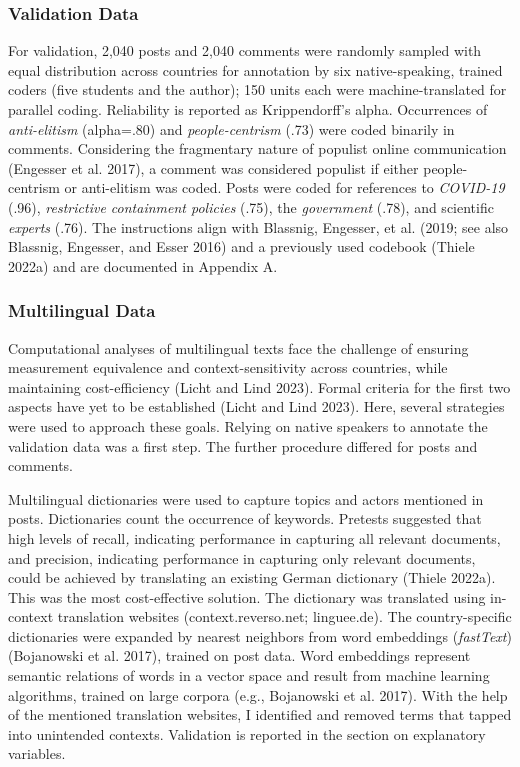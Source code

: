 \documentclass[
]{ccr}
\begin{document}
\hypertarget{validation-data}{%
\subsubsection{Validation Data}\label{validation-data}}

For validation, 2,040 posts and 2,040 comments were randomly sampled
with equal distribution across countries for annotation by six
native-speaking, trained coders (five students and the author); 150
units each were machine-translated for parallel coding. Reliability is
reported as Krippendorff's alpha. Occurrences of \emph{anti-elitism}
(alpha=.80) and \emph{people-centrism} (.73) were coded binarily in
comments. Considering the fragmentary nature of populist online
communication (Engesser et al. 2017), a comment was considered populist
if either people-centrism or anti-elitism was coded. Posts were coded
for references to \emph{COVID-19} (.96), \emph{restrictive containment
policies} (.75), the \emph{government} (.78), and scientific
\emph{experts} (.76). The instructions align with Blassnig, Engesser, et
al. (2019; see also Blassnig, Engesser, and Esser 2016) and a previously
used codebook (Thiele 2022a) and are documented in Appendix A.

\hypertarget{multilingual-data}{%
\subsubsection{Multilingual Data}\label{multilingual-data}}

Computational analyses of multilingual texts face the challenge of
ensuring measurement equivalence and context-sensitivity across
countries, while maintaining cost-efficiency (Licht and Lind 2023).
Formal criteria for the first two aspects have yet to be established
(Licht and Lind 2023). Here, several strategies were used to approach
these goals. Relying on native speakers to annotate the validation data
was a first step. The further procedure differed for posts and comments.

Multilingual dictionaries were used to capture topics and actors
mentioned in posts. Dictionaries count the occurrence of keywords.
Pretests suggested that high levels of recall\emph{,} indicating
performance in capturing all relevant documents, and precision,
indicating performance in capturing only relevant documents, could be
achieved by translating an existing German dictionary (Thiele 2022a).
This was the most cost-effective solution. The dictionary was translated
using in-context translation websites (context.reverso.net; linguee.de).
The country-specific dictionaries were expanded by nearest neighbors
from word embeddings (\emph{fastText}) (Bojanowski et al. 2017), trained
on post data. Word embeddings represent semantic relations of words in a
vector space and result from machine learning algorithms, trained on
large corpora (e.g., Bojanowski et al. 2017). With the help of the
mentioned translation websites, I identified and removed terms that
tapped into unintended contexts. Validation is reported in the section
on explanatory variables.
\end{document}
